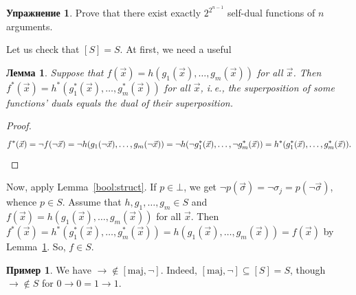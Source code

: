 \documentclass[12pt,notitlepage]{article}
\theoremstyle{plain}
\newtheorem{lemma}[thm]{Лемма}
\theoremstyle{definition}
\newtheorem{exc}[thm]{Упражнение}
\newtheorem{exm}[thm]{Пример}
\theoremstyle{plain}
\newcommand{\sbs}{\subseteq}
\newcommand{\1}{\mathbf{1}}
\newcommand{\0}{\mathbf{0}}
\begin{document}
\begin{exc}
	Prove that there exist exactly $2^{2^{n-1}}$ self-dual functions of $n$ arguments.
\end{exc}

\noindent Let us check that $[S] = S$. At first, we need a useful
\begin{lemma}\label{bool:dual_super}
	Suppose that $f(\vec x) = h(g_1(\vec x),\ldots, g_m(\vec x))$ for all $\vec x$. Then $f^*(\vec x) = h^*(g^*_1(\vec x),\ldots, g^*_m(\vec x))$ for all $\vec x$, i.\,e.,
	the superposition of some functions' duals equals the dual of their superposition.
\end{lemma}
\begin{proof}
	$$
	f^*(\vec x) = \neg f (\neg\vec x) =  \neg h(g_1(\neg \vec x),\ldots,g_m(\neg \vec x)) =\\
	\neg h(\neg g^*_1(\vec x),\ldots,\neg g^*_m(\vec x)) = h^*(g^*_1(\vec x),\ldots,g^*_m(\vec x)).
	$$
\end{proof}
Now, apply Lemma~\ref{bool:struct}. If $p \in \bot$, we get $\neg p(\vec \sigma) = \neg \sigma_j = p(\neg\vec\sigma)$, whence $p \in S$. Assume that $h, g_1, \ldots,g_m \in S$ and $f(\vec x) = h(g_1(\vec x),\ldots, g_m(\vec x))$ for all $\vec x$. Then $f^*(\vec x) = h^*(g^*_1(\vec x),\ldots,g^*_m(\vec x)) = h(g_1(\vec x),\ldots, g_m(\vec x)) = f(\vec x)$ by Lemma~\ref{bool:dual_super}. So, $f \in S$.

\begin{exm}
	We have ${\to} \notin [\mathrm{maj}, {\neg}]$. Indeed, $[\mathrm{maj}, {\neg}] \sbs [S] = S$, though ${\to} \notin S$ for $0 \to 0 = 1 \to 1$.
\end{exm}
\end{document}
